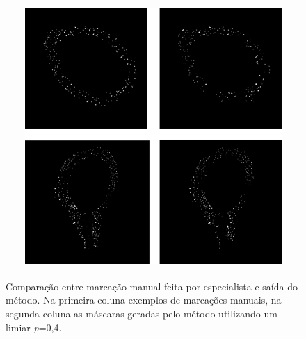 \begin{figure}[H]
    \center
    \begin{tabular}{@{}c@{}}
        \includegraphics[width=0.9\textwidth]{figures/4_results/figure-manuel-net-results-comparision_lower_res.png}
        \\[\abovecaptionskip]
    \end{tabular}
  
    \caption[Comparação entre marcação manual feita por especialista e saída do método.]{Comparação entre marcação manual feita por especialista e saída do método. Na primeira coluna exemplos de marcações manuais, na segunda coluna as máscaras geradas pelo método utilizando um limiar \textit{p}=0,4.}
    \label{fig:marcacoes-final}
\end{figure}


